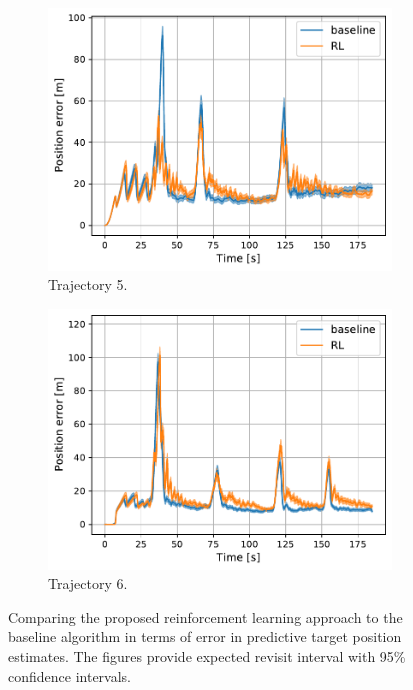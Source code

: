 \documentclass[english, 12pt, a4paper, elec, utf8, a-1b, online]{aaltothesis}
\begin{document}
\begin{figure}
\begin{subfigure}[b]{0.45\textwidth}
    \end{subfigure}
    \hfill
    \begin{subfigure}[b]{0.45\textwidth}
        \centering
        \includegraphics[width=\linewidth]{figures/benchmark/Simulations/mean_position_error4.pdf}
        \caption{Trajectory 5.}
        \label{fig:PE_T5}
    \end{subfigure}
    \hfill
    \begin{subfigure}[b]{0.45\textwidth}
        \centering
        \includegraphics[width=\linewidth]{figures/benchmark/Simulations/mean_position_error5.pdf}
        \caption{Trajectory 6.}
        \label{fig:PE_T6}
    \end{subfigure}
    \caption{Comparing the proposed reinforcement learning approach to the baseline algorithm in terms of error in predictive target position estimates.
    The figures provide expected revisit interval with 95\% confidence intervals.}
    \label{fig:position_error_comparison}
\end{figure}
\end{document}
